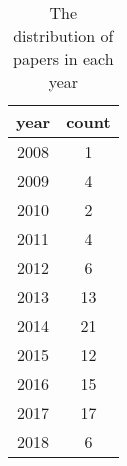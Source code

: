 \begin{table}
	\label{tbl:literature_year}
	\caption{The distribution of papers in each year}
	\begin{tabular}{|c|c|}
\hline
year & count\\\hline
2008 & 1\\\hline
2009 & 4\\\hline
2010 & 2\\\hline
2011 & 4\\\hline
2012 & 6\\\hline
2013 & 13\\\hline
2014 & 21\\\hline
2015 & 12\\\hline
2016 & 15\\\hline
2017 & 17\\\hline
2018 & 6\\\hline
\end{tabular}
\end{table}
